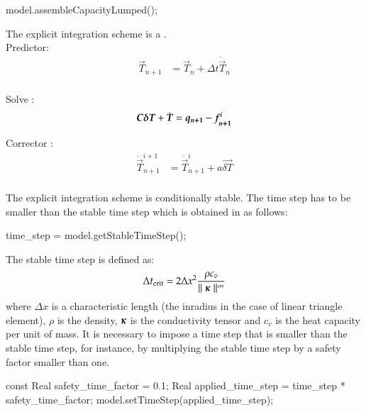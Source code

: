 \begin{cpp}
  model.assembleCapacityLumped();
\end{cpp}

The explicit integration scheme is a .\\

Predictor:
\begin{align}
\vec{T}_{n+1} &= \vec{T}_{n} + \Delta t \dot{\vec{T}}_{n} \\
\end{align}

Solve :
\begin{equation}
\boldsymbol{C} \boldsymbol{\delta T} +  \dot{\boldsymbol{T}} = \boldsymbol{q_{n+1}} - \boldsymbol{f^i_{n+1}} 
\end{equation}

Corrector :
\begin{align}
\dot{\vec{T}}^{i+1}_{n+1} &= \dot{\vec{T}}^{i}_{n+1} + a \vec{\delta T} \\
\end{align}

The explicit integration scheme is conditionally stable. The time step has to be
smaller than the stable time step which is obtained in \akantu as follows:

\begin{cpp}
  time_step = model.getStableTimeStep();
\end{cpp}

The stable time step is defined as:
\begin{equation}\label{eqn:smm:explicit:stabletime}
  \Delta t_{{\mathrm{crit}}} = 2 \Delta x^2 \frac{\rho c_v}{\mid\mid \boldsymbol{\kappa} \mid\mid^\infty}
\end{equation}
where $\Delta  x$ is a  characteristic length (\eg  the inradius in the  case of
linear triangle  element), $\rho$ is the density, $\boldsymbol{\kappa}$ is the conductivity tensor
and $c_v$ is the heat capacity per unit of mass. It is
necessary to impose a  time step that is smaller than the  stable time step, for
instance, by  multiplying the stable time  step by a safety  factor smaller than
one.

\begin{cpp}
  const Real safety_time_factor = 0.1;
  Real applied_time_step = time_step * safety_time_factor;
  model.setTimeStep(applied_time_step);
\end{cpp}
